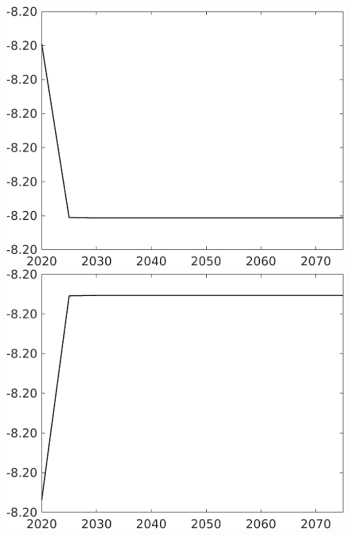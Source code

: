 \documentclass[12pt]{article}
\begin{document}
\begin{figure}[h!!]
\begin{minipage}[]{0.32\textwidth}
	\end{minipage}	
	\begin{minipage}[]{0.32\textwidth}
		\includegraphics[width=1\textwidth]{../../codding_model/own_basedOnFried/optimalPol_010922_revision/figures/all_13Sept22/CompTaul_LFBAUPer_Reg0_F_spillover0_nsk1_xgr1_knspil0_sep1_countec0_GovRev0_etaa0.79.png}
	\end{minipage}	
	\begin{minipage}[]{0.32\textwidth}
		\includegraphics[width=1\textwidth]{../../codding_model/own_basedOnFried/optimalPol_010922_revision/figures/all_13Sept22/CompTaul_LFBAUPer_Reg0_G_spillover0_nsk1_xgr1_knspil0_sep1_countec0_GovRev0_etaa0.79.png}

\end{minipage}
\end{figure}
\end{document}
